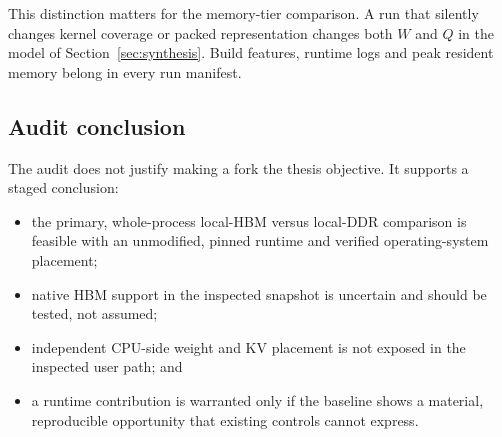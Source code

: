 This distinction matters for the memory-tier comparison.  A run that
silently changes kernel coverage or packed representation changes both
\(W\) and \(Q\) in the model of Section~\ref{sec:synthesis}.  Build
features, runtime logs and peak resident memory belong in every run
manifest.

\subsection{Audit conclusion}

The audit does not justify making a \lcpp{} fork the thesis objective.
It supports a staged conclusion:

\begin{itemize}
  \item the primary, whole-process local-HBM versus local-DDR comparison
        is feasible with an unmodified, pinned runtime and verified
        operating-system placement;
  \item native HBM support in the inspected snapshot is uncertain and
        should be tested, not assumed;
  \item independent CPU-side weight and KV placement is not exposed in
        the inspected user path; and
  \item a runtime contribution is warranted only if the baseline shows
        a material, reproducible opportunity that existing controls
        cannot express.
\end{itemize}
